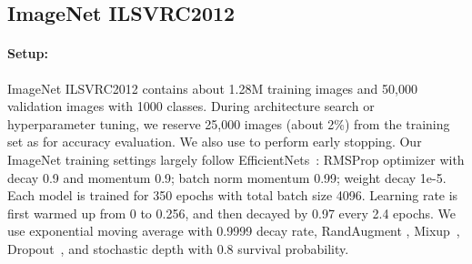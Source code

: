 \documentclass{article}
\begin{document}
\subsection{ImageNet ILSVRC2012}
\label{sec:imagenet1k}


\paragraph{Setup:}
ImageNet ILSVRC2012 \cite{imagenet15} contains about 1.28M training images and 50,000 validation images with 1000 classes.  During architecture search or hyperparameter tuning, we reserve 25,000 images (about 2\%) from the training set as  for accuracy evaluation. We also use  to perform early stopping. Our ImageNet training settings largely follow EfficientNets~\cite{efficientnet19}: RMSProp optimizer with decay 0.9 and momentum 0.9; batch norm momentum 0.99; weight decay 1e-5. Each model is trained for 350 epochs with total batch size 4096. Learning rate is first warmed up from 0 to 0.256, and then decayed by 0.97 every 2.4 epochs. We use exponential moving average with 0.9999 decay rate, RandAugment \cite{randaug20}, Mixup~\cite{mixup18}, Dropout~\cite{dropout14}, and stochastic depth \cite{droppath16} with 0.8 survival probability.
\end{document}
